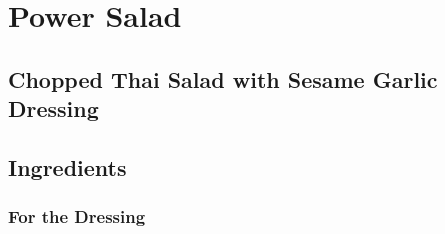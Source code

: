 \documentclass[ansiapaper,10pt,english]{sphinxmanual}
\begin{document}
\chapter{Power Salad}
\label{\detokenize{Power_Salad:power-salad}}\label{\detokenize{Power_Salad::doc}}

\section{Chopped Thai Salad with Sesame Garlic Dressing}
\label{\detokenize{Power_Salad:chopped-thai-salad-with-sesame-garlic-dressing}}

\section{Ingredients}
\label{\detokenize{Power_Salad:ingredients}}

\subsection{For the Dressing}
\label{\detokenize{Power_Salad:for-the-dressing}}
%
\begin{sphinxVerbatim}[commandchars=\\\{\}]
   

   

     

  

    

  

   

   

    
\end{sphinxVerbatim}
\end{document}
